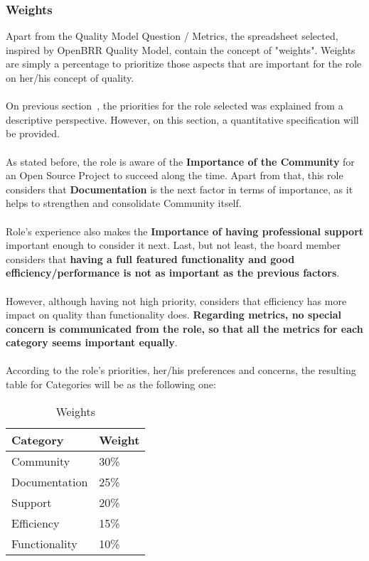 \documentclass[11pt]{article}
\begin{document}
\subsubsection{Weights}\label{sec:weights}
Apart from the Quality Model Question / Metrics, the spreadsheet selected, inspired by OpenBRR Quality Model, contain the concept of "weights". Weights are simply a percentage to prioritize those aspects that are important for the role on her/his concept of quality. \\
\\
On previous section~, the priorities for the role selected was explained from a descriptive perspective. However, on this section, a quantitative specification will be provided.\\
\\
As stated before, the role is aware of the \textbf{Importance of the Community} for an Open Source Project to succeed along the time. Apart from that, this role considers that \textbf{Documentation} is the next factor in terms of importance, as it helps to strengthen and consolidate Community itself.\\
\\
Role's experience also makes the \textbf{Importance of having professional support} important enough to consider it next. Last, but not least, the board member considers that \textbf{having a full featured functionality and good efficiency/performance is not as important as the previous factors}.\\
\\
However, although having not high priority, considers that efficiency has more impact on quality than functionality does. \textbf{Regarding metrics, no special concern is communicated from the role, so that all the metrics for each category seems important equally}.\\
\\
According to the role's priorities, her/his preferences and concerns, the resulting table for Categories will be as the following one:
\begin{table}[H]
  \begin{center}
    \begin{tabular}{ | l | l | }
    \hline
    Category & Weight \\
    \hline
    Community & 30\%\\
    Documentation & 25\% \\
    Support & 20\% \\
    Efficiency & 15\% \\
    Functionality & 10\% \\
    \hline
    \end{tabular}
    \caption{Weights}
    \label{tab:weights}
  \end{center}
\end{table}
\end{document}
